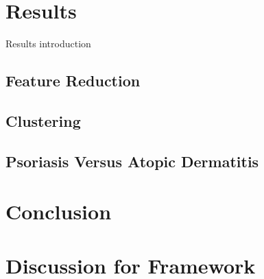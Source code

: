 \documentclass[10pt,a4paper]{article}
\begin{document}
	
	\section{Results}
	\label{sec:Results}
	Results introduction
	
	\subsection{Feature Reduction}
	\label{subsec:ResultsFeatureResuction}
	
	
	
	
	
	\subsection{Clustering}
	\label{subsec:ResultsPositionalClustering}
	
	
	
	
	\subsection{Psoriasis Versus Atopic Dermatitis}
	\label{subsec:ResultsPsoriasisVersusAtopicDermatitis}
	
	
	\section{Conclusion}
	\label{sec:Conclusion}
	
	
	\section{Discussion for Framework}
	\label{sec:DiscussionForFramework}
	
	
	
	
	 
	
	
	\appendix
	
\end{document}
